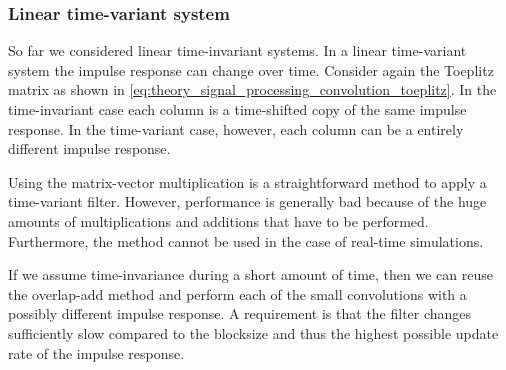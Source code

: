 \subsubsection{Linear time-variant system}
So far we considered linear time-invariant systems. In a linear time-variant
system the impulse response can change over time. Consider again the Toeplitz
matrix as shown in \ref{eq:theory_signal_processing_convolution_toeplitz}. In
the time-invariant case each column is a time-shifted copy of the same impulse
response. In the time-variant case, however, each column can be a entirely
different impulse response.

Using the matrix-vector multiplication is a straightforward method to apply a
time-variant filter. However, performance is generally bad because of the huge
amounts of multiplications and additions that have to be performed. Furthermore,
the method cannot be used in the case of real-time simulations.

If we assume time-invariance during a short amount of time, then we can reuse
the overlap-add method and perform each of the small convolutions with a
possibly different impulse response. A requirement is that the filter changes
sufficiently slow compared to the blocksize and thus the highest possible update
rate of the impulse response.







\newpage

